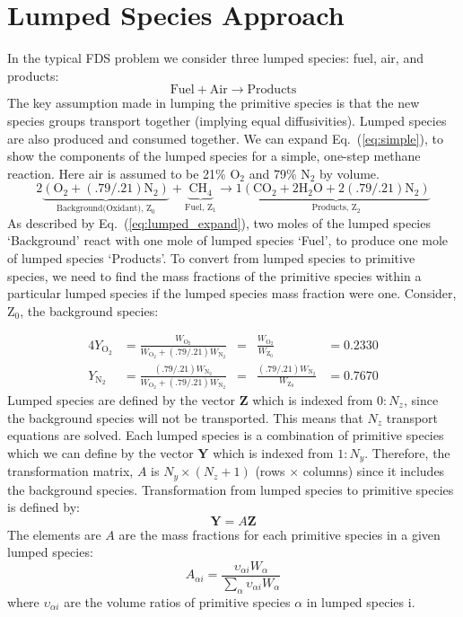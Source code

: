 \section{Lumped Species Approach}
In the typical FDS problem we consider three lumped species: fuel, air, and products:
\begin{equation}\label{eq:simple}
\mathrm{Fuel + Air \rightarrow Products}
\end{equation}
The key assumption made in lumping the primitive species is that the new species groups transport together (implying equal diffusivities). Lumped species are also produced and consumed together. We can expand Eq.~(\ref{eq:simple}), to show the components of the lumped species for a simple, one-step methane reaction. Here air is assumed to be 21\% O$_2$ and 79\% N$_2$ by volume.
\begin{equation}\label{eq:lumped_expand}
\mathrm{2\underbrace{(\mbox{O}_2+(.79/.21)\mbox{N}_2)}_\text{Background(Oxidant),~Z$_0$}+\underbrace{\mbox{CH}_4}_\text{Fuel,~Z$_1$} \rightarrow 1\underbrace{(\mbox{CO}_2+2\mbox{H}_2\mbox{O}+2(.79/.21)\mbox{N}_2)}_\text{Products,~Z$_2$}}
\end{equation}
As described by Eq.~(\ref{eq:lumped_expand}), two moles of the lumped species `Background' react with one mole of lumped species `Fuel', to produce one mole of lumped species `Products'. To convert from lumped species to primitive species, we need to find the mass fractions of the primitive species within a particular lumped species if the lumped species mass fraction were one. Consider, Z$_0$, the background species:

\begin{alignat}{4}\label{eq:backgroud}
Y_\mathrm{O_{2}} &= \frac{W_\mathrm{O_{2}}}{W_\mathrm{O_{2}}+(.79/.21)W_\mathrm{N_{2}}} &=& \frac{W_\mathrm{O_{2}}}{W_{\mathrm{Z_0}}} &= 0.2330 \\
\nonumber Y_\mathrm{N_{2}} &= \frac{(.79/.21)W_\mathrm{N_{2}}}{W_\mathrm{O_{2}}+(.79/.21)W_\mathrm{N_{2}}} &=& \frac{(.79/.21)W_\mathrm{N_{2}}}{W_{\mathrm{Z_0}}} &= 0.7670
\end{alignat}
Lumped species are defined by the vector $\textbf{Z}$ which is indexed from $0:N_{z}$, since the background species will not be transported. This means that $N_{z}$ transport equations are solved. Each lumped species is a combination of primitive species which we can define by the vector $\textbf{Y}$ which is indexed from $1:N_{y}$. Therefore, the transformation matrix, $A$ is $N_{y} \times (N_{z}+1)$ (rows $\times$ columns) since it includes the background species. Transformation from lumped species to primitive species is defined by: 
\begin{equation}\label{eq:transform}
\textbf{Y}=A\textbf{Z} 
\end{equation}
The elements are $A$ are the mass fractions for each primitive species in a given lumped species:
\begin{equation}\label{eq:A_def}
A_{\alpha i} = \frac{\upsilon_{\alpha i}W_{\alpha}}{\displaystyle \sum_{\alpha}\upsilon_{\alpha i}W_{\alpha}}
\end{equation}
where $\upsilon_{\alpha i}$ are the volume ratios of primitive species $\alpha$ in lumped species {i}.

